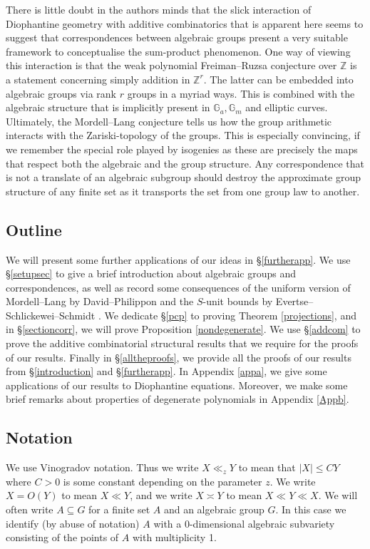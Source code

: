 \documentclass[12pt, reqno]{amsart}
\newcommand{\G}{\mathbb{G}}
\theoremstyle{remark}
\theoremstyle{definition}
\numberwithin{equation}{section}
\begin{document}
  There is little doubt in the authors minds that the slick interaction of Diophantine geometry with additive combinatorics that is apparent here seems to suggest that correspondences between algebraic groups present a very suitable framework to conceptualise the sum-product phenomenon. One way of viewing this interaction is that  the weak polynomial Freiman--Ruzsa conjecture over $\mathbb{Z}$ is a statement concerning simply addition in $\mathbb{Z}^r$. The latter can be embedded into algebraic groups via rank $r$ groups in a myriad ways. This is combined with the algebraic structure that is implicitly present in $\G_a, \G_m$ and elliptic curves. Ultimately, the Mordell--Lang conjecture tells us how the group arithmetic interacts with the Zariski-topology of the groups. This is especially convincing, if we remember the special role played by isogenies as these are precisely the maps that respect both the algebraic and the group structure. Any correspondence that is not a translate of an algebraic subgroup should destroy the approximate group structure of any finite set as it transports the set from one group law to another.  
  
 


\subsection*{Outline}
We will present some further applications of our ideas in \S\ref{furtherapp}. We use \S\ref{setupsec} to give a brief introduction about algebraic groups and correspondences, as well as record some consequences of the uniform version of Mordell--Lang by David--Philippon \cite{DavidPhilippon} and the $S$-unit bounds by Evertse--Schlickewei--Schmidt \cite{ESSlinear}. We dedicate \S\ref{pcp} to proving Theorem \ref{projections}, and in \S\ref{sectioncorr}, we will prove Proposition \ref{nondegenerate}. We use \S\ref{addcom} to prove the additive combinatorial structural results that we require for the proofs of our results. Finally in \S\ref{alltheproofs}, we provide all the proofs of our results from \S\ref{introduction} and \S\ref{furtherapp}.
In  Appendix \ref{appa}, we give some applications of our results to Diophantine equations. Moreover, we make some brief remarks about properties of degenerate polynomials in Appendix \ref{Appb}.


\subsection*{Notation} We use Vinogradov notation. Thus we write $X \ll_z Y$ to mean that $|X| \leq C Y$ where $C>0$ is some constant depending on the parameter $z$. We write $X = O(Y)$ to mean $X \ll Y$, and we write $X\asymp Y$ to mean $X \ll Y \ll X$. We will often write $A \subseteq G$  for a finite set $A$ and an algebraic group $G$. In this case we identify (by abuse of notation) $A$ with a 0-dimensional algebraic subvariety consisting of the points of $A$ with multiplicity 1. 
\end{document}
